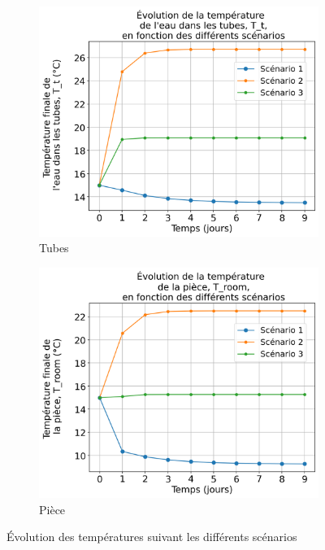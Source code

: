 \documentclass[12pt]{article}
\begin{document}
\begin{figure}
            \begin{subfigure}{0.48\textwidth}
                \centering
                \includegraphics[width=1\linewidth]{Rapport/figures/T_t.png}
                \caption{Tubes} 
                \label{fig:Tt}
            \end{subfigure}
            \begin{subfigure}{0.48\textwidth}
                \centering
                \includegraphics[width=1\linewidth]{Rapport/figures/T_room.png}
                \caption{Pièce} 
                \label{fig:Troom}
            \end{subfigure}
            
            \caption{Évolution des températures suivant les différents scénarios}
            \label{fig:Scenario}
        \end{figure}
\end{document}
